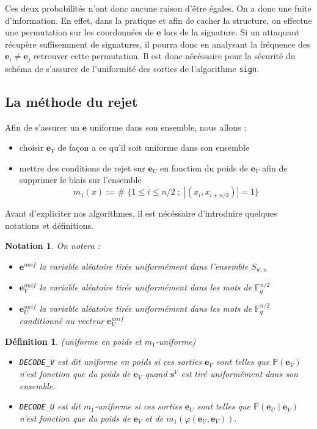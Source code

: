 \documentclass[12pt]{article}
\theoremstyle{plain}
\newtheorem{defi}[thm]{Définition}
\newtheorem{nota}[thm]{Notation}
\newcommand{\F}{\mathbb{F}}
\newcommand{\e}{\mathbf{e}}
\begin{document}
Ces deux probabilités n'ont donc aucune raison d'être égales. On a donc une fuite d'information. En effet, dans la pratique et afin de cacher la structure, on effectue une permutation sur les coordonnées de $\mathbf{e}$ lors de la signature. Si un attaquant récupère suffisemment de signatures, il pourra donc en analysant la fréquence des $\mathbf{e}_i \neq \mathbf{e}_j$ retrouver cette permutation. Il est donc nécéssaire pour la sécurité du schéma de s'assurer de l'uniformité des sorties de l'algorithme \verb|sign|.

\subsection{La méthode du rejet}
Afin de s'assurer un $\mathbf{e}$ uniforme dans son ensemble, nous allons :
\begin{itemize}
\item choisir $\mathbf{e}_V$ de façon a ce qu'il soit uniforme dans son ensemble 
\item mettre des conditions de rejet sur $\mathbf{e}_U$ en fonction du poids de $\mathbf{e}_V$ afin de supprimer le biais sur l'ensemble 
$$ m_1(x) := \# \; \{1  \leq i \leq n/2 \;;\; |(x_i, x_{i+n/2})| = 1\}$$
\end{itemize}
Avant d'expliciter nos algorithmes, il est nécéssaire d'introduire quelques notations et définitions. \\

\begin{nota} On notera :
\begin{itemize}
\item $\mathbf{e}^{unif}$ la variable aléatoire tirée uniformément dans l'ensemble $S_{w,n}$
\item $\mathbf{e}_V^{unif}$ la variable aléatoire tirée uniformément dans les mots de $\F_q^{n/2}$ 
\item $\mathbf{e}_U^{unif}$ la variable aléatoire tirée uniformément dans les mots de $\F_q^{n/2}$ conditionné au vecteur $\e_V^{unif}$
\end{itemize}
\end{nota}


\begin{defi} (uniforme en poids et $m_1$-uniforme)
\begin{itemize}
\item \verb|DECODE_V| est dit uniforme en poids si ces sorties $\mathbf{e}_V$ sont telles que $\mathbb{P}(\mathbf{e}_V)$ n'est fonction que du poids de $\mathbf{e}_V$ quand $\mathbf{s}^V$ est tiré uniformément dans son ensemble.
\item \verb|DECODE_U| est dit $m_1$-uniforme si ces sorties $\mathbf{e}_U$ sont telles que $\mathbb{P}(\mathbf{e}_U\; |\;  \mathbf{e}_V)$ n'est fonction que du poids de $\mathbf{e}_V$ et de $m_1(\varphi(\mathbf{e}_U,\mathbf{e}_V))$.
\end{itemize}
\end{defi}
\end{document}

